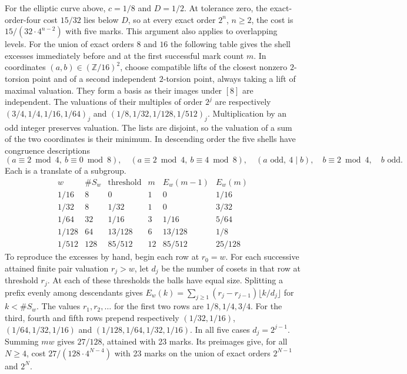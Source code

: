 For the elliptic curve above, $c=1/8$ and $D=1/2$. At tolerance zero, the exact-order-four cost $15/32$ lies below $D$, so at every exact order $2^n$, $n\ge2$, the cost is $15/(32\cdot4^{n-2})$ with five marks. This argument also applies to overlapping levels. For the union of exact orders $8$ and $16$ the following table gives the shell excesses immediately before and at the first successful mark count $m$. In coordinates $(a,b)\in(\mathbb Z/16)^2$, choose compatible lifts of the closest nonzero $2$-torsion point and of a second independent $2$-torsion point, always taking a lift of maximal valuation. They form a basis as their images under $[8]$ are independent. The valuations of their multiples of order $2^j$ are respectively $(3/4,1/4,1/16,1/64)_j$ and $(1/8,1/32,1/128,1/512)_j$. Multiplication by an odd integer preserves valuation. The lists are disjoint, so the valuation of a sum of the two coordinates is their minimum. In descending order the five shells have congruence descriptions
\[
 (a\equiv2\bmod4,\ b\equiv0\bmod8),\quad
 (a\equiv2\bmod4,\ b\equiv4\bmod8),\quad
 (a\text{ odd},\ 4\mid b),\quad b\equiv2\bmod4,\quad b\text{ odd}.
\]
Each is a translate of a subgroup.
\[
\begin{array}{c|r|c|r|cc}
w& \#S_w& \text{threshold}&m&E_w(m-1)&E_w(m)\\\hline
1/16 &8&0&1&0&1/16\\
1/32 &8&1/32&1&0&3/32\\
1/64 &32&1/16&3&1/16&5/64\\
1/128 &64&13/128&6&13/128&1/8\\
1/512 &128&85/512&12&85/512&25/128
\end{array}
\]
To reproduce the excesses by hand, begin each row at $r_0=w$. For each successive attained finite pair valuation $r_j>w$, let $d_j$ be the number of cosets in that row at threshold $r_j$. At each of these thresholds the balls have equal size. Splitting a prefix evenly among descendants gives $E_w(k)=\sum_{j\ge1}(r_j-r_{j-1})\lfloor k/d_j\rfloor$ for $k<\#S_w$. The values $r_1,r_2,\ldots$ for the first two rows are $1/8,1/4,3/4$. For the third, fourth and fifth rows prepend respectively $(1/32,1/16)$, $(1/64,1/32,1/16)$ and $(1/128,1/64,1/32,1/16)$. In all five cases $d_j=2^{j-1}$. Summing $mw$ gives $27/128$, attained with 23 marks. Its preimages give, for all $N\ge4$, cost $27/(128\cdot4^{N-4})$ with 23 marks on the union of exact orders $2^{N-1}$ and $2^N$.

